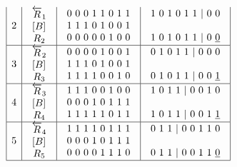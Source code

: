 $$\begin{array}{c}
\begin{array}{|c|c|c|c|}
2 & \begin{array}{c}\overleftarrow{R}_1 \\  \left[B\right]_{\textup{}} \\ R_2\end{array} & \begin{array}{c}0\ 0\ 0\ 1\ 1\ 0\ 1\ 1 \\ 1\ 1\ 1\ 0\ 1\ 0\ 0\ 1 \\ 0\ 0\ 0\ 0\ 0\ 1\ 0\ 0\end{array} & \begin{array}{c}1\ 0\ 1\ 0\ 1\ 1\ |\ 0\ 0 \\  \\ 1\ 0\ 1\ 0\ 1\ 1\ |\ 0\ \underline{0}\end{array} \\ \hline 
3 & \begin{array}{c}\overleftarrow{R}_2 \\  \left[B\right]_{\textup{}} \\ R_3\end{array} & \begin{array}{c}0\ 0\ 0\ 0\ 1\ 0\ 0\ 1 \\ 1\ 1\ 1\ 0\ 1\ 0\ 0\ 1 \\ 1\ 1\ 1\ 1\ 0\ 0\ 1\ 0\end{array} & \begin{array}{c}0\ 1\ 0\ 1\ 1\ |\ 0\ 0\ 0 \\  \\ 0\ 1\ 0\ 1\ 1\ |\ 0\ 0\ \underline{1}\end{array} \\ \hline 
4 & \begin{array}{c}\overleftarrow{R}_3 \\  \left[B\right]_{\textup{}} \\ R_4\end{array} & \begin{array}{c}1\ 1\ 1\ 0\ 0\ 1\ 0\ 0 \\ 0\ 0\ 0\ 1\ 0\ 1\ 1\ 1 \\ 1\ 1\ 1\ 1\ 1\ 0\ 1\ 1\end{array} & \begin{array}{c}1\ 0\ 1\ 1\ |\ 0\ 0\ 1\ 0 \\  \\ 1\ 0\ 1\ 1\ |\ 0\ 0\ 1\ \underline{1}\end{array} \\ \hline 
5 & \begin{array}{c}\overleftarrow{R}_4 \\  \left[B\right]_{\textup{}} \\ R_5\end{array} & \begin{array}{c}1\ 1\ 1\ 1\ 0\ 1\ 1\ 1 \\ 0\ 0\ 0\ 1\ 0\ 1\ 1\ 1 \\ 0\ 0\ 0\ 0\ 1\ 1\ 1\ 0\end{array} & \begin{array}{c}0\ 1\ 1\ |\ 0\ 0\ 1\ 1\ 0 \\  \\ 0\ 1\ 1\ |\ 0\ 0\ 1\ 1\ \underline{0}\end{array} \\ \hline 

\end{array}
\end{array}$$
